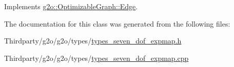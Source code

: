 Implements \mbox{\hyperlink{classg2o_1_1_optimizable_graph_1_1_edge_a804b9a2178249b9297c55b8fbbeda56e}{g2o\+::\+Optimizable\+Graph\+::\+Edge}}.



The documentation for this class was generated from the following files\+:\begin{DoxyCompactItemize}
\item 
Thirdparty/g2o/g2o/types/\mbox{\hyperlink{types__seven__dof__expmap_8h}{types\+\_\+seven\+\_\+dof\+\_\+expmap.\+h}}\item 
Thirdparty/g2o/g2o/types/\mbox{\hyperlink{types__seven__dof__expmap_8cpp}{types\+\_\+seven\+\_\+dof\+\_\+expmap.\+cpp}}\end{DoxyCompactItemize}

